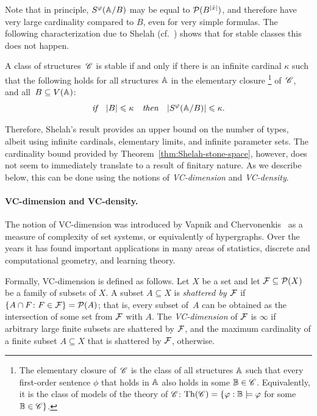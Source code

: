 Note that in principle, $S^\varphi(\mathbb A/B)$ may be equal to
$\mathcal{P}(B^{|\bar x|})$, and therefore have very large cardinality
compared to $B$, even for very simple formulas.  The following
characterization due to Shelah (cf.~\cite[Theorem 2.2, Chapter
II]{shelah1990classification}) shows that for stable classes this does
not happen.
\begin{theorem}\label{thm:Shelah-stone-space}
  A class of structures\, $\mathscr{C}$ is stable if and only if there is an
  infinite cardinal $\kappa$ such that the following holds for all
  structures $\mathbb A$ in the elementary closure \footnote{The
    elementary closure of\, $\mathscr{C}$ is the class of all structures
    $\mathbb A$ such that every first-order sentence $\phi$ that holds in
    $\mathbb A$ also holds in some $\mathbb B\in \mathscr{C}$. Equivalently, it is
    the class of models of the theory of $\mathscr{C}$:
    $\mathrm{Th}(\mathscr{C})=\{\varphi : \mathbb B\models\varphi$ for some
    $\mathbb B \in \mathscr{C}\}$.} of~$\mathscr{C}$, and all~$B\subseteq V(\mathbb A)$:
$$  \textit{if\quad}|B|\leqslant \kappa\textit {\quad then\quad}
|S^\varphi(\mathbb A/B)|\leqslant \kappa.$$
\end{theorem}
Therefore, Shelah's result provides an upper bound on the number of
types, albeit using infinite cardinals, elementary limits, and
infinite parameter sets.  The cardinality bound provided by
Theorem~\ref{thm:Shelah-stone-space}, however, does not seem to
immediately translate to a result of finitary nature. As we describe
below, this can be done using the notions of {\em{VC-dimension}} and
{\em{VC-density}}.

\paragraph{VC-dimension and VC-density.} 
The notion of VC-dimension was introduced by Vapnik and
Chervonenkis~\cite{chervonenkis1971theory} as a measure of complexity
of set systems, or equivalently of hypergraphs.  Over the years it has
found important applications in many areas of statistics, discrete and
computational geometry, and learning theory.

Formally, VC-dimension is defined as follows.  Let $X$ be a set and
let $\mathcal{F}\subseteq \mathcal{P}(X)$ be a family of subsets of $X$.  A subset
$A\subseteq X$ is \emph{shattered by $\mathcal{F}$} if
$\{A\cap F\colon F\in \mathcal{F}\}=\mathcal{P}(A)$; that is, every subset of~$A$
can be obtained as the intersection of some set from $\mathcal{F}$ with $A$.
The \emph{VC-dimension} of $\mathcal{F}$ is $\infty$ if arbitrary large
finite subsets are shattered by $\mathcal{F}$, and the maximum cardinality of
a finite subset $A\subseteq X$ that is shattered by $\mathcal{F}$, otherwise.

